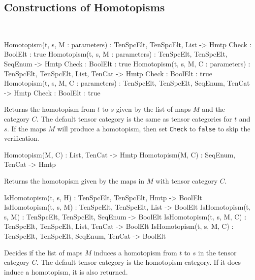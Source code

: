 \subsection{Constructions of Homotopisms}~

\begin{intrinsics}
Homotopism(t, s, M : parameters) : TenSpcElt, TenSpcElt, List -> Hmtp
    Check : BoolElt : true
Homotopism(t, s, M : parameters) : TenSpcElt, TenSpcElt, SeqEnum -> Hmtp
    Check : BoolElt : true
Homotopism(t, s, M, C : parameters) : TenSpcElt, TenSpcElt, List, TenCat -> Hmtp
    Check : BoolElt : true
Homotopism(t, s, M, C : parameters) : TenSpcElt, TenSpcElt, SeqEnum, TenCat -> Hmtp
    Check : BoolElt : true
\end{intrinsics}

Returns the homotopism from $t$ to $s$ given by the list of maps $M$ and the category $C$. 
The default tensor category is the same as tensor categories for $t$ and $s$.
If the maps $M$ will produce a homotopism, then set \texttt{Check} to \texttt{false} to skip the verification.

\begin{intrinsics}
Homotopism(M, C) : List, TenCat -> Hmtp
Homotopism(M, C) : SeqEnum, TenCat -> Hmtp
\end{intrinsics}

Returns the homotopism given by the maps in $M$ with tensor category $C$. 

\begin{intrinsics}
IsHomotopism(t, s, H) : TenSpcElt, TenSpcElt, Hmtp -> BoolElt
IsHomotopism(t, s, M) : TenSpcElt, TenSpcElt, List -> BoolElt
IsHomotopism(t, s, M) : TenSpcElt, TenSpcElt, SeqEnum -> BoolElt
IsHomotopism(t, s, M, C) : TenSpcElt, TenSpcElt, List, TenCat -> BoolElt
IsHomotopism(t, s, M, C) : TenSpcElt, TenSpcElt, SeqEnum, TenCat -> BoolElt
\end{intrinsics}

Decides if the list of maps $M$ induces a homotopism from $t$ to $s$ in the tensor category $C$. 
The default tensor category is the homotopism category. 
If it does induce a homotopism, it is also returned.

